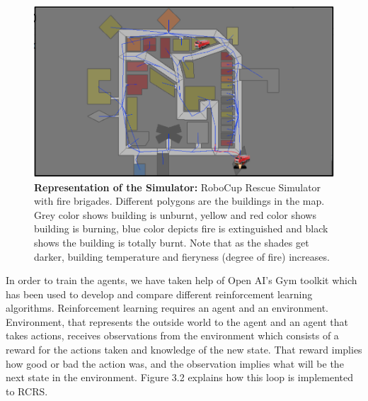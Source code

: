 \documentclass[12pt]{report}
\begin{document}
\begin{figure}[!h]
    \centering
    \includegraphics[width=12cm]{13}
    \caption{\textbf{Representation of the Simulator:} RoboCup Rescue Simulator with fire brigades. Different polygons are the buildings in the map. Grey color shows building is unburnt, yellow and red color shows building is burning, blue color depicts fire is extinguished and black shows the building is totally burnt. Note that as the shades get darker, building temperature and fieryness (degree of fire) increases.}
    \label{fig:x}
\end{figure}

In order to train the agents, we have taken help of Open AI's Gym toolkit \cite{brockman2016openai} which has been used to develop and compare different reinforcement learning algorithms. Reinforcement learning requires an agent and an environment. Environment, that represents the outside world to the agent and an agent that takes actions, receives observations from the environment which consists of a reward for the actions taken and knowledge of the new state. That reward implies how good or bad the action was, and the observation implies what will be the next state in the environment. Figure 3.2 explains how this loop is implemented to RCRS. 
\end{document}

